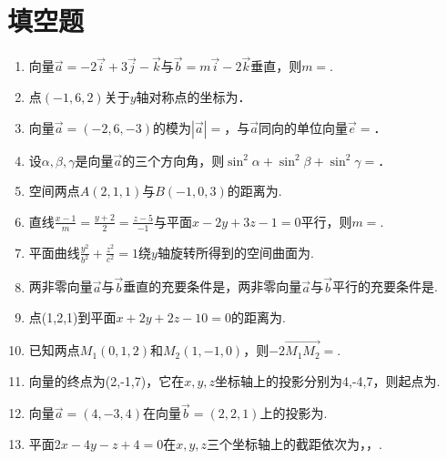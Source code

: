 \section{填空题}
\begin{enumerate}
	\item 向量$\vec{a}=-2\vec{i}+3\vec{j}-\vec{k}$与$\vec{b}=m\vec{i}-2\vec{k}$垂直，则$m=$\blank .
	\item 点$(-1,6,2)$关于$y$轴对称点的坐标为\blank ．
	\item 向量$\vec{a}=(-2,6,-3)$的模为$ |\vec{a}|= $\blank ，与$ \vec{a} $同向的单位向量$ \vec{e}= $\blank ．
	\item 设$\alpha,\beta,\gamma$是向量$\vec{a}$的三个方向角，则$ \sin^2 \alpha + \sin^2 \beta + \sin^2 \gamma = $\blank ．
	\item 空间两点$ A(2,1,1) $与$ B(-1,0,3) $的距离为\blank .
	\item 直线$ \frac{x-1}{m}=\frac{y+2}{2}=\frac{z-5}{-1}$与平面$ x-2y+3z-1=0 $平行，则$m=$\blank .
	\item 平面曲线$ \frac{y^2}{b^2}+\frac{z^2}{c^2}=1 $绕$ y $轴旋转所得到的空间曲面为\blank .
	\item 两非零向量$ \vec{a} $与$ \vec{b} $垂直的充要条件是\blank ，两非零向量$ \vec{a} $与$ \vec{b} $平行的充要条件是\blank .
	\item 点(1,2,1)到平面$ x+2y+2z-10=0 $的距离为\blank .
	\item 已知两点$ M_1(0,1,2) $和$ M_2(1,-1,0) $，则$ -2\overrightarrow{M_1M_2}=$\blank .
	\item 向量的终点为(2,-1,7)，它在$ x,y,z $坐标轴上的投影分别为4,-4,7，则起点为\blank .
	\item 向量$ \vec{a}=(4,-3,4) $在向量$ \vec{b}=(2,2,1) $上的投影为\blank .
	\item 平面$ 2x-4y-z+4=0 $在$ x,y,z $三个坐标轴上的截距依次为\blank[1em]，\blank[1em]，\blank[1em].
\end{enumerate}
